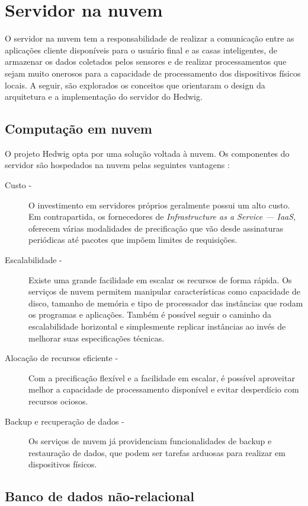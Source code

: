 \section{Servidor na nuvem}

O servidor na nuvem tem a responsabilidade de realizar a comunicação entre as aplicações cliente disponíveis para o usuário final e as casas inteligentes, de armazenar os dados coletados pelos sensores e de realizar processamentos que sejam muito onerosos para a capacidade de processamento dos dispositivos físicos locais. A seguir, são explorados os conceitos que orientaram o design da arquitetura e a implementação do servidor do Hedwig.

\subsection{Computação em nuvem}

O projeto Hedwig opta por uma solução voltada à nuvem. Os componentes do servidor são hospedados na nuvem pelas seguintes vantagens \cite{viswanathan}:

\begin{description}
\item[Custo -]O investimento em servidores próprios geralmente possui um alto custo. Em contrapartida, os fornecedores de \emph{Infrastructure as a Service --- IaaS}, oferecem várias modalidades de precificação que vão desde assinaturas periódicas até pacotes que impõem limites de requisições.
\item[Escalabilidade -]Existe uma grande facilidade em escalar os recursos de forma rápida. Os serviços de nuvem permitem manipular características como capacidade de disco, tamanho de memória e tipo de processador das instâncias que rodam os programas e aplicações. Também é possível seguir o caminho da escalabilidade horizontal e simplesmente replicar instâncias ao invés de melhorar suas especificações técnicas.
\item[Alocação de recursos eficiente -]Com a precificação flexível e a facilidade em escalar, é possível aproveitar melhor a capacidade de processamento disponível e evitar desperdício com recursos ociosos.
\item[Backup e recuperação de dados -]Os serviços de nuvem já providenciam funcionalidades de backup e restauração de dados, que podem ser tarefas arduosas para realizar em dispositivos físicos.
\end{description}

\subsection{Banco de dados não-relacional}

